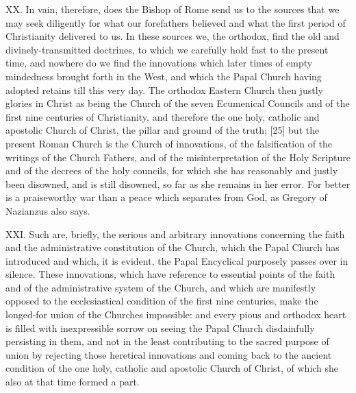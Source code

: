 XX. In vain, therefore, does the Bishop of Rome send us to the sources
that we may seek diligently for what our forefathers believed and what
the first period of Christianity delivered to us. In these sources we,
the orthodox, find the old and divinely-transmitted doctrines, to which
we carefully hold fast to the present time, and nowhere do we find the
innovations which later times of empty mindedness brought forth in the
West, and which the Papal Church having adopted retains till this very
day. The orthodox Eastern Church then justly glories in Christ as being
the Church of the seven Ecumenical Councils and of the first nine
centuries of Christianity, and therefore the one holy, catholic and
apostolic Church of Christ, \textquotesingle the pillar and ground of
the truth\textquotesingle; {[}25{]} but the present Roman Church is the
Church of innovations, of the falsification of the writings of the
Church Fathers, and of the misinterpretation of the Holy Scripture and
of the decrees of the holy councils, for which she has reasonably and
justly been disowned, and is still disowned, so far as she remains in
her error. \textquotesingle For better is a praiseworthy war than a
peace which separates from God,\textquotesingle{} as Gregory of
Nazianzus also says.

XXI. Such are, briefly, the serious and arbitrary innovations concerning
the faith and the administrative constitution of the Church, which the
Papal Church has introduced and which, it is evident, the Papal
Encyclical purposely passes over in silence. These innovations, which
have reference to essential points of the faith and of the
administrative system of the Church, and which are manifestly opposed to
the ecclesiastical condition of the first nine centuries, make the
longed-for union of the Churches impossible: and every pious and
orthodox heart is filled with inexpressible sorrow on seeing the Papal
Church disdainfully persisting in them, and not in the least
contributing to the sacred purpose of union by rejecting those heretical
innovations and coming back to the ancient condition of the one holy,
catholic and apostolic Church of Christ, of which she also at that time
formed a part.

